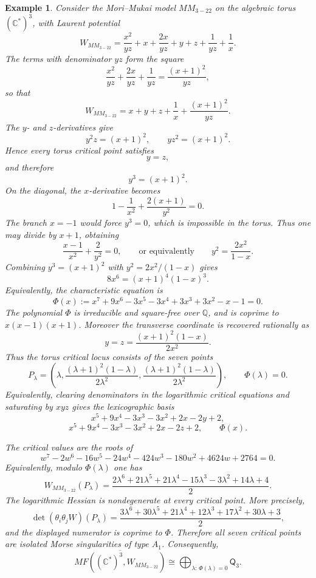 \documentclass[11pt]{amsart}
\newtheorem{example}{Example}[section]
\newcommand{\MorseCat}[1]{\mathsf{Q}_{#1}}
\begin{document}
\begin{example}
Consider the Mori--Mukai model $MM_{3-22}$ on the algebraic torus
$(\mathbb{C}^*)^3$, with Laurent potential
\[
W_{MM_{3-22}}=\frac{x^2}{yz}+x+\frac{2x}{yz}+y+z
+\frac{1}{yz}+\frac{1}{x}.
\]
The terms with denominator $yz$ form the square
\[
\frac{x^2}{yz}+\frac{2x}{yz}+\frac{1}{yz}
=\frac{(x+1)^2}{yz},
\]
so that
\[
W_{MM_{3-22}}=x+y+z+\frac{1}{x}+\frac{(x+1)^2}{yz}.
\]
The $y$- and $z$-derivatives give
\[
y^2z=(x+1)^2,
\qquad
yz^2=(x+1)^2.
\]
Hence every torus critical point satisfies
\[
y=z,
\]
and therefore
\[
y^3=(x+1)^2.
\]
On the diagonal, the $x$-derivative becomes
\[
1-\frac{1}{x^2}+\frac{2(x+1)}{y^2}=0.
\]
The branch $x=-1$ would force $y^3=0$, which is impossible in the torus. Thus
one may divide by $x+1$, obtaining
\[
\frac{x-1}{x^2}+\frac{2}{y^2}=0,
\qquad\text{or equivalently}\qquad
y^2=\frac{2x^2}{1-x}.
\]
Combining $y^3=(x+1)^2$ with $y^2=2x^2/(1-x)$ gives
\[
8x^6=(x+1)^4(1-x)^3.
\]
Equivalently, the characteristic equation is
\[
\Phi(x):=x^7+9x^6-3x^5-3x^4+3x^3+3x^2-x-1=0.
\]
The polynomial $\Phi$ is irreducible and square-free over $\mathbb{Q}$, and is
coprime to $x(x-1)(x+1)$. Moreover the transverse coordinate is recovered
rationally as
\[
y=z=\frac{(x+1)^2(1-x)}{2x^2}.
\]
Thus the torus critical locus consists of the seven points
\[
P_\lambda=\left(\lambda,
\frac{(\lambda+1)^2(1-\lambda)}{2\lambda^2},
\frac{(\lambda+1)^2(1-\lambda)}{2\lambda^2}\right),
\qquad
\Phi(\lambda)=0.
\]
Equivalently, clearing denominators in the logarithmic critical equations and
saturating by $xyz$ gives the lexicographic basis
\[
x^5+9x^4-3x^3-3x^2+2x-2y+2,
\]
\[
x^5+9x^4-3x^3-3x^2+2x-2z+2,
\qquad
\Phi(x).
\]

The critical values are the roots of
\[
w^7-2w^6-16w^5-24w^4-424w^3-180w^2+4624w+2764=0.
\]
Equivalently, modulo $\Phi(\lambda)$ one has
\[
W_{MM_{3-22}}(P_\lambda)=
\frac{2\lambda^6+21\lambda^5+21\lambda^4-15\lambda^3
-3\lambda^2+14\lambda+4}{2}.
\]
The logarithmic Hessian is nondegenerate at every critical point. More
precisely,
\[
\det(\theta_i\theta_jW)(P_\lambda)
=\frac{3\lambda^6+30\lambda^5+21\lambda^4+12\lambda^3
+17\lambda^2+30\lambda+3}{2},
\]
and the displayed numerator is coprime to $\Phi$. Therefore all seven critical
points are isolated Morse singularities of type $A_1$. Consequently,
\[
\overline{MF((\mathbb{C}^*)^3,W_{MM_{3-22}})}
\cong \bigoplus_{\lambda:\,\Phi(\lambda)=0}\MorseCat{3}.
\]
\end{example}
\end{document}
